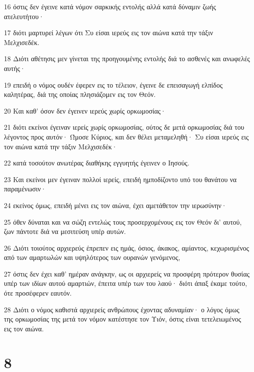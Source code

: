 \par 16 όστις δεν έγεινε κατά νόμον σαρκικής εντολής αλλά κατά δύναμιν ζωής ατελευτήτου·
\par 17 διότι μαρτυρεί λέγων ότι Συ είσαι ιερεύς εις τον αιώνα κατά την τάξιν Μελχισεδέκ.
\par 18 Διότι αθέτησις μεν γίνεται της προηγουμένης εντολής διά το ασθενές και ανωφελές αυτής·
\par 19 επειδή ο νόμος ουδέν έφερεν εις το τέλειον, έγεινε δε επεισαγωγή ελπίδος καλητέρας, διά της οποίας πλησιάζομεν εις τον Θεόν.
\par 20 Και καθ' όσον δεν έγεινεν ιερεύς χωρίς ορκωμοσίας·
\par 21 διότι εκείνοι έγειναν ιερείς χωρίς ορκωμοσίας, ούτος δε μετά ορκωμοσίας διά του λέγοντος προς αυτόν· Ώμοσε Κύριος, και δεν θέλει μεταμεληθή· Συ είσαι ιερεύς εις τον αιώνα κατά την τάξιν Μελχισεδέκ·
\par 22 κατά τοσούτον ανωτέρας διαθήκης εγγυητής έγεινεν ο Ιησούς.
\par 23 Και εκείνοι μεν έγειναν πολλοί ιερείς, επειδή ημποδίζοντο υπό του θανάτου να παραμένωσιν·
\par 24 εκείνος όμως, επειδή μένει εις τον αιώνα, έχει αμετάθετον την ιερωσύνην·
\par 25 όθεν δύναται και να σώζη εντελώς τους προσερχομένους εις τον Θεόν δι' αυτού, ζων πάντοτε διά να μεσιτεύση υπέρ αυτών.
\par 26 Διότι τοιούτος αρχιερεύς έπρεπεν εις ημάς, όσιος, άκακος, αμίαντος, κεχωρισμένος από των αμαρτωλών και υψηλότερος των ουρανών γενόμενος,
\par 27 όστις δεν έχει καθ' ημέραν ανάγκην, ως οι αρχιερείς να προσφέρη πρότερον θυσίας υπέρ των ιδίων αυτού αμαρτιών, έπειτα υπέρ των του λαού· διότι άπαξ έκαμε τούτο, ότε προσέφερεν εαυτόν.
\par 28 Διότι ο νόμος καθιστά αρχιερείς ανθρώπους έχοντας αδυναμίαν· ο λόγος όμως της ορκωμοσίας της μετά τον νόμον κατέστησε τον Υιόν, όστις είναι τετελειωμένος εις τον αιώνα.

\chapter{8}

